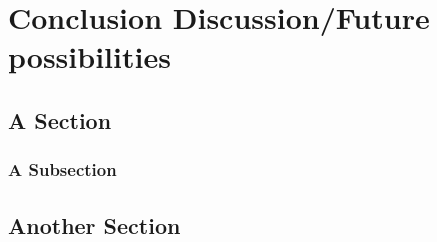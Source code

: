\documentclass[a4paper, 12pt, oneside]{Thesis}  %
\begin{document}
\chapter{Conclusion Discussion/Future possibilities}

\section{A Section}


\subsection{A Subsection}


\section{Another Section}


\clearpage



\appendix %

\label{morethan}

\label{distinct}

\label{handover}


\backmatter

\label{Bibliography}
\end{document}
